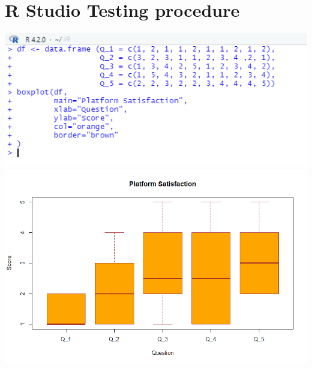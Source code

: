 \documentclass[lettersize,journal]{IEEEtran}
\begin{document}
\section{R Studio Testing procedure}
\includegraphics[width=\textwidth]{R.png}
\includegraphics[width=\textwidth]{boxAndWhisker.png}
\newpage
\clearpage
\twocolumn
\end{document}
